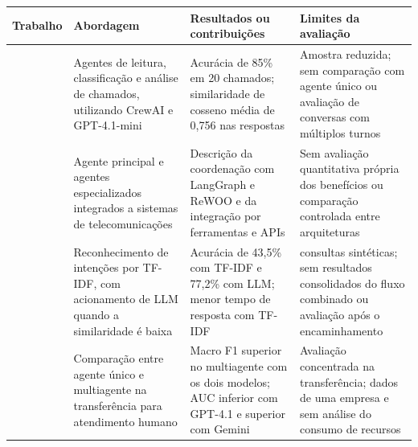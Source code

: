 \begin{quadro}[htb]
    \centering
    \caption{Síntese dos trabalhos relacionados}
    \label{quadro:trabalhos-relacionados}
    \footnotesize
    \renewcommand{\arraystretch}{1.15}

    \begin{tabularx}{\textwidth}{
        |>{\raggedright\arraybackslash}p{2.5cm}
        |>{\raggedright\arraybackslash}X
        |>{\raggedright\arraybackslash}X
        |>{\raggedright\arraybackslash}X|
    }
        \hline
        \textbf{Trabalho} &
        \textbf{Abordagem} &
        \textbf{Resultados ou contribuições} &
        \textbf{Limites da avaliação} \\
        \hline

        \textcite{moncada2025} &
        Agentes de leitura, classificação e análise de chamados,
        utilizando CrewAI e GPT-4.1-mini &
        Acurácia de 85\% em 20 chamados; similaridade de cosseno
        média de 0,756 nas respostas &
        Amostra reduzida; sem comparação com agente único
        ou avaliação de conversas com múltiplos turnos \\
        \hline

        \textcite{lee2025} &
        Agente principal e agentes especializados integrados
        a sistemas de telecomunicações &
        Descrição da coordenação com LangGraph e ReWOO
        e da integração por ferramentas e APIs &
        Sem avaliação quantitativa própria dos benefícios
        ou comparação controlada entre arquiteturas \\
        \hline

        \textcite{yang2025} &
        Reconhecimento de intenções por TF-IDF,
        com acionamento de LLM quando a similaridade é baixa &
        Acurácia de 43,5\% com TF-IDF e 77,2\% com LLM;
        menor tempo de resposta com TF-IDF &
        30 consultas sintéticas; sem resultados consolidados
        do fluxo combinado ou avaliação após o encaminhamento \\
        \hline

        \textcite{amri2026} &
        Comparação entre agente único e multiagente
        na transferência para atendimento humano &
        Macro F1 superior no multiagente com os dois modelos;
        AUC inferior com GPT-4.1 e superior com Gemini &
        Avaliação concentrada na transferência;
        dados de uma empresa e sem análise do consumo de recursos \\
        \hline


\end{tabularx}
\end{quadro}
